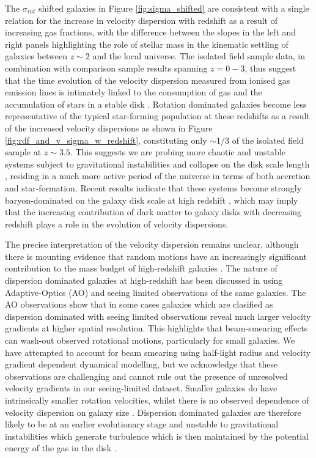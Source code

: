 \documentclass[fleqn,usenatbib]{mn2e}
\begin{document}
The $\sigma_{int}$ shifted galaxies in Figure \ref{fig:sigma_shifted} are consistent with a single relation for the increase in velocity dispersion with redshift as a result of increasing gas fractions, with the difference between the slopes in the left and right panels highlighting the role of stellar mass in the kinematic settling of galaxies between $z\sim2$ and the local universe. 
The isolated field sample data, in combination with comparison sample results spanning $z=0-3$, thus suggest that the time evolution of the velocity dispersion measured from ionised gas emission lines is intimately linked to the consumption of gas and the accumulation of stars in a stable disk \citep[e.g.][]{Law2009,Law2012b,Law2012c,Wisnioski2015}.
Rotation dominated galaxies become less representative of the typical star-forming population at these redshifts as a result of the increased velocity dispersions as shown in Figure \ref{fig:rdf_and_v_sigma_w_redshift}, constituting only $\sim1/3$ of the isolated field sample at $z\sim3.5$.
This suggests we are probing more chaotic and unstable systems subject to gravitational instabilities and collapse on the disk scale length \citep{Burkert2010,Genzel2011}, residing in a much more active period of the universe in terms of both accretion and star-formation.
Recent results indicate that these systems become strongly baryon-dominated on the galaxy disk scale at high redshift \citep{Ubler2017,Lang2017,Genzel2017}, which may imply that the increasing contribution of dark matter to galaxy disks with decreasing redshift plays a role in the evolution of velocity dispersions.   

The precise interpretation of the velocity dispersion remains unclear, although there is mounting evidence that random motions have an increasingly significant contribution to the mass budget of high-redshift galaxies \citep[e.g.][]{Kassin2007,Law2009,Burkert2010,Kassin2012,Wuyts2016b,Lang2017,Ubler2017,Genzel2017}.
The nature of dispersion dominated galaxies at high-redshift has been discussed in \cite{Newman2013} using Adaptive-Optics (AO) and seeing limited observations of the same galaxies.
The AO observations show that in some cases galaxies which are clasified as dispersion dominated with seeing limited observations reveal much larger velocity gradients at higher spatial resolution.
This highlights that beam-smearing effects can wash-out observed rotational motions, particularly for small galaxies.
We have attempted to account for beam smearing using half-light radius and velocity gradient dependent dynamical modelling, but we acknowledge that these observations are challenging and cannot rule out the presence of unresolved velocity gradients in our seeing-limited dataset.
Smaller galaxies do have intrinsically smaller rotation velocities, whilst there is no observed dependence of velocity dispersion on galaxy size \citep[e.g.][]{Newman2013}.
Dispersion dominated galaxies are therefore likely to be at an earlier evolutionary stage and unstable to gravitational instabilities which generate turbulence which is then maintained by the potential energy of the gas in the disk \citep{Burkert2010,Newman2013}.
\end{document}
